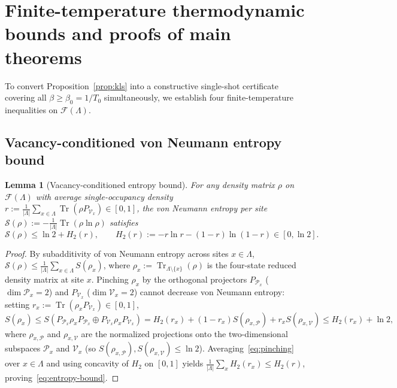 \documentclass[11pt]{article}
\newtheorem{lemma}[theorem]{Lemma}
\theoremstyle{definition}
\theoremstyle{remark}
\DeclareMathOperator{\Tr}{Tr}
\newcommand{\calF}{\mathcal{F}}
\newcommand{\calP}{\mathcal{P}}
\newcommand{\calV}{\mathcal{V}}
\newcommand{\calS}{\mathcal{S}}
\begin{document}
\section{Finite-temperature thermodynamic bounds and proofs of main theorems}\label{sec:thermo}

To convert Proposition~\ref{prop:kls} into a constructive single-shot certificate covering all $\beta \ge \beta_0 = 1/T_0$ simultaneously, we establish four finite-temperature inequalities on $\calF(\Lambda)$.

\subsection{Vacancy-conditioned von Neumann entropy bound}\label{subsec:entropy}

\begin{lemma}[Vacancy-conditioned entropy bound]\label{lem:entropy}
For any density matrix $\rho$ on $\calF(\Lambda)$ with average single-occupancy density $r := \frac{1}{|\Lambda|}\sum_{x \in \Lambda}\Tr(\rho P_{\calV_x}) \in [0, 1]$, the von Neumann entropy per site $\calS(\rho) := -\frac{1}{|\Lambda|}\Tr(\rho\ln\rho)$ satisfies
\begin{equation}\label{eq:entropy-bound}
\calS(\rho) \le \ln 2 + H_2(r), \qquad H_2(r) := -r\ln r - (1-r)\ln(1-r) \in [0, \ln 2].
\end{equation}
\end{lemma}

\begin{proof}
By subadditivity of von Neumann entropy across sites $x \in \Lambda$, $\calS(\rho) \le \frac{1}{|\Lambda|}\sum_{x \in \Lambda} S(\rho_x)$, where $\rho_x := \Tr_{\Lambda \setminus \{x\}}(\rho)$ is the four-state reduced density matrix at site $x$. Pinching $\rho_x$ by the orthogonal projectors $P_{\calP_x}$ ($\dim \calP_x = 2$) and $P_{\calV_x}$ ($\dim \calV_x = 2$) cannot decrease von Neumann entropy: setting $r_x := \Tr(\rho_x P_{\calV_x}) \in [0, 1]$,
\begin{equation}\label{eq:pinching}
S(\rho_x) \le S\!\left(P_{\calP_x}\rho_x P_{\calP_x} \oplus P_{\calV_x}\rho_x P_{\calV_x}\right) = H_2(r_x) + (1 - r_x) S(\rho_{x,\calP}) + r_x S(\rho_{x,\calV}) \le H_2(r_x) + \ln 2,
\end{equation}
where $\rho_{x,\calP}$ and $\rho_{x,\calV}$ are the normalized projections onto the two-dimensional subspaces $\calP_x$ and $\calV_x$ (so $S(\rho_{x,\calP}), S(\rho_{x,\calV}) \le \ln 2$). Averaging~\eqref{eq:pinching} over $x \in \Lambda$ and using concavity of $H_2$ on $[0, 1]$ yields $\frac{1}{|\Lambda|}\sum_x H_2(r_x) \le H_2(r)$, proving~\eqref{eq:entropy-bound}.
\end{proof}
\end{document}
